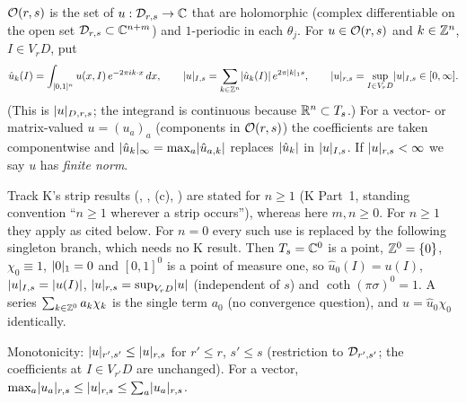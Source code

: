 \begin{definition}\label{bpN:p4:norm}
$\mathcal O(r,s)$ is the set of $u:\mathcal D_{r,s}\to\mathbb{C}$ that are holomorphic (complex differentiable on the open set $\mathcal D_{r,s}\subset\mathbb{C}^{n+m}$) and $1$-periodic in each $\theta_j$. For $u\in\mathcal O(r,s)$ and $k\in\mathbb{Z}^n$,
$I\in V_rD$, put
\[\hat u_k(I)=\int_{[0,1]^n}u(x,I)\,e^{-2\pi ik\cdot x}\,dx,\qquad \lvert u\rvert_{I,s}=\sum_{k\in\mathbb{Z}^n}\lvert \hat u_k(I)\rvert\,e^{2\pi\lvert k\rvert_1s},\qquad \lvert u\rvert_{r,s}=\sup_{I\in V_rD}\lvert u\rvert_{I,s}\in[0,\infty].\]
(This is $\lvert u\rvert_{D,r,s}$; the integrand is continuous because $\mathbb{R}^n\subset T_s$.) For a vector- or matrix-valued $u=(u_a)_a$ (components in $\mathcal O(r,s)$) the coefficients are taken
componentwise and $\lvert \hat u_k\rvert_\infty=\max_a\lvert \hat u_{a,k}\rvert$ replaces $\lvert \hat u_k\rvert$ in $\lvert u\rvert_{I,s}$. If $\lvert u\rvert_{r,s}<\infty$ we say $u$ has \emph{finite norm}.
\end{definition}
\begin{remark}[The case $n=0$ (no angles)]\label{bpN:p4:n-zero}
Track K's strip results (, , (c), ) are stated for $n\ge1$ (K Part~1, standing convention ``$n\ge1$ wherever a strip occurs''), whereas here $m,n\ge0$. For $n\ge1$ they apply as cited below. For $n=0$ every such use is replaced by the following singleton branch, which needs no K result. Then $T_s=\mathbb{C}^0$ is a point, $\mathbb{Z}^0=\{0\}$, $\chi_0\equiv1$, $\lvert 0\rvert_1=0$ and $[0,1]^0$ is a point of measure one, so $\hat u_0(I)=u(I)$, $\lvert u\rvert_{I,s}=\lvert u(I)\rvert$, $\lvert u\rvert_{r,s}=\sup_{V_rD}\lvert u\rvert$ (independent of $s$) and $\coth(\pi\sigma)^0=1$. A series $\sum_{k\in\mathbb{Z}^0}a_k\chi_k$ is the single term $a_0$ (no convergence question), and $u=\hat u_0\chi_0$ identically.
\end{remark}
Monotonicity: $\lvert u\rvert_{r',s'}\le\lvert u\rvert_{r,s}$ for $r'\le r$, $s'\le s$ (restriction to $\mathcal D_{r',s'}$; the coefficients at $I\in V_{r'}D$ are unchanged). For a vector, $\max_a\lvert u_a\rvert_{r,s}\le\lvert u\rvert_{r,s}\le\sum_a\lvert u_a\rvert_{r,s}$.

